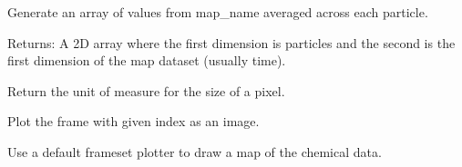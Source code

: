 \documentclass[letterpaper,10pt,english]{sphinxmanual}
\begin{document}
\begin{fulllineitems}
\begin{fulllineitems}
\begin{quote}
\begin{description}
\begin{itemize}
\end{itemize}

\end{description}\end{quote}

\end{fulllineitems}


\begin{fulllineitems}
\label{\detokenize{xanespy:xanespy.xanes_frameset.XanesFrameset.particle_series}}
Generate an array of values from map\_name averaged across each
particle.

Returns: A 2D array where the first dimension is particles and
the second is the first dimension of the map dataset (usually time).

\end{fulllineitems}


\begin{fulllineitems}
\label{\detokenize{xanespy:xanespy.xanes_frameset.XanesFrameset.pixel_unit}}
Return the unit of measure for the size of a pixel.

\end{fulllineitems}


\begin{fulllineitems}
\label{\detokenize{xanespy:xanespy.xanes_frameset.XanesFrameset.plot_frame}}
Plot the frame with given index as an image.

\end{fulllineitems}


\begin{fulllineitems}
\label{\detokenize{xanespy:xanespy.xanes_frameset.XanesFrameset.plot_histogram}}
Use a default frameset plotter to draw a map of the chemical
data.


\end{fulllineitems}
\end{fulllineitems}
\end{document}
